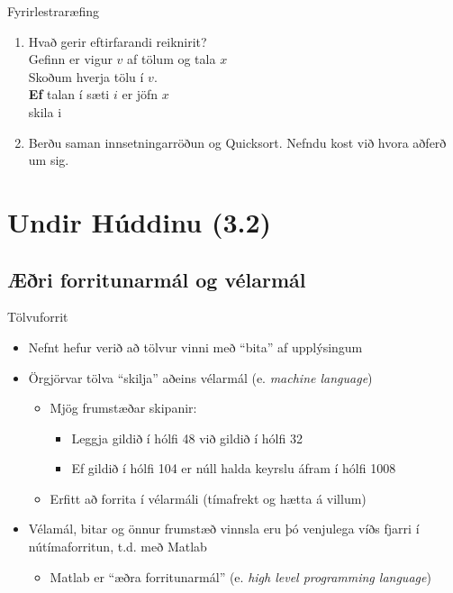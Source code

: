 \documentclass[handout]{beamer}
\begin{document}
\begin{frame}{Fyrirlestraræfing}
\begin{enumerate}
    \item Hvað gerir eftirfarandi reiknirit?\\
    \vspace{\baselineskip}
    Gefinn er vigur $v$ af tölum og tala $x$\\
    Skoðum hverja tölu í $v$.\\
    \textbf{Ef} talan í sæti $i$ er jöfn $x$\\
    \quad skila i
    \item Berðu saman innsetningarröðun og Quicksort. Nefndu kost við hvora aðferð um sig.
\end{enumerate}
\end{frame}

\section{Undir Húddinu (3.2)}

\subsection{Æðri forritunarmál og vélarmál}
\begin{frame}{Tölvuforrit}
 \begin{itemize}
  \item Nefnt hefur verið að tölvur vinni með ``bita'' af upplýsingum
  \item Örgjörvar tölva ``skilja'' aðeins vélarmál (e. \emph{machine language})
  \begin{itemize}
   \item Mjög frumstæðar skipanir:
   \begin{itemize}
    \item Leggja gildið í hólfi 48 við gildið í hólfi 32
    \item Ef gildið í hólfi 104 er núll halda keyrslu áfram í hólfi 1008
   \end{itemize}
   \item Erfitt að forrita í vélarmáli (tímafrekt og hætta á villum)
  \end{itemize}
    \item Vélamál, bitar og önnur frumstæð vinnsla eru þó venjulega víðs fjarri í nútímaforritun, t.d. með Matlab
  \begin{itemize}
   \item Matlab er ``æðra forritunarmál'' (e. \emph{high level programming language})
  \end{itemize}
 \end{itemize}
\end{frame}
\end{document}
